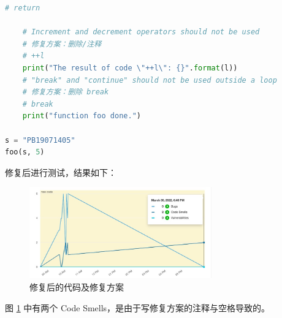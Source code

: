 \documentclass{article}
\begin{document}
\begin{enumerate}[label=\arabic*.]
\begin{lstlisting}[language=python]
    # return

    # Increment and decrement operators should not be used
    # 修复方案：删除/注释
    # ++l
    print("The result of code \"++l\": {}".format(l))
    # "break" and "continue" should not be used outside a loop
    # 修复方案：删除 break
    # break
    print("function foo done.")

s = "PB19071405"
foo(s, 5)

        \end{lstlisting}

        修复后进行测试，结果如下：\\
        \begin{figure}[H]
            \centering
            \includegraphics[width=0.7\textwidth]{fig/hw01/fixed.jpg}
            \caption{修复后的代码及修复方案}
            \label{fixed}
        \end{figure}

        图 \ref{fixed} 中有两个 Code Smells，是由于写修复方案的注释与空格导致的。


    \end{enumerate}
\end{document}
